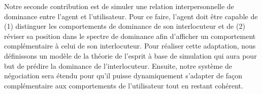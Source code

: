	Notre seconde contribution est de simuler une relation interpersonnelle de dominance entre l'agent et l'utilisateur. Pour ce faire, l'agent doit être capable de (1) distinguer les comportements de dominance de son interlocuteur et  de (2) réviser sa position dans le spectre de dominance afin  d'afficher un comportement complémentaire à celui de son interlocuteur. 
	Pour réaliser cette adaptation, nous définissons un modèle de la théorie de l'esprit à base de simulation qui aura pour but de prédire la dominance de l'interlocuteur. Ensuite, notre système de négociation sera étendu pour qu'il puisse dynamiquement s'adapter de façon complémentaire aux comportements de l'utilisateur tout en restant cohérent. 


		
		  